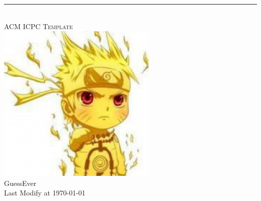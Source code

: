 \begin{center}
	\pagestyle{empty}
	\hrule
	~\\[100pt]
	\fontsize{48pt}{\baselineskip}\selectfont \textsc{ACM ICPC Template}\\[80pt]
	\includegraphics[width=3in]{./logo.jpg}
	~\\[100pt]
	\Huge GuessEver \\[20pt]
	\Large Last Modify at \today\\
	\clearpage
\end{center}
